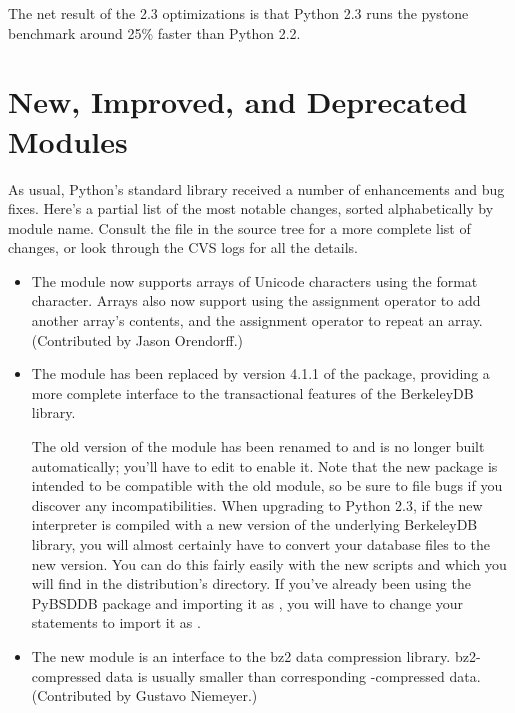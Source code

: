 \documentclass{howto}
\begin{document}
The net result of the 2.3 optimizations is that Python 2.3 runs the 
pystone benchmark around 25\% faster than Python 2.2.


\section{New, Improved, and Deprecated Modules}

As usual, Python's standard library received a number of enhancements and
bug fixes.  Here's a partial list of the most notable changes, sorted
alphabetically by module name. Consult the
 file in the source tree for a more
complete list of changes, or look through the CVS logs for all the
details.

\begin{itemize}

\item The  module now supports arrays of Unicode
characters using the  format character.  Arrays also now
support using the \code{+=} assignment operator to add another array's
contents, and the \code{*=} assignment operator to repeat an array.
(Contributed by Jason Orendorff.)

\item The  module has been replaced by version 4.1.1
of the  package,
providing a more complete interface to the transactional features of
the BerkeleyDB library.

The old version of the module has been renamed to 
 and is no longer built automatically; you'll 
have to edit  to enable it.  Note that the new
 package is intended to be compatible with the 
old module, so be sure to file bugs if you discover any
incompatibilities.  When upgrading to Python 2.3, if the new interpreter is compiled
with a new version of 
the underlying BerkeleyDB library, you will almost certainly have to
convert your database files to the new version.  You can do this
fairly easily with the new scripts  and
 which you will find in the distribution's
 directory.  If you've already been using the PyBSDDB
package and importing it as , you will have to change your
 statements to import it as .

\item The new  module is an interface to the bz2 data
compression library.  bz2-compressed data is usually smaller than 
corresponding -compressed data. (Contributed by Gustavo Niemeyer.)
 

\end{itemize}
\end{document}
